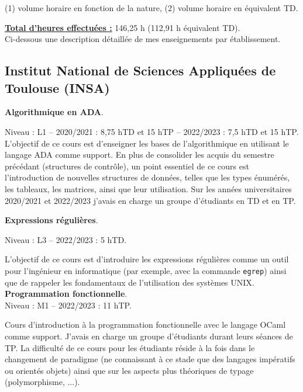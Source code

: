 (1) volume horaire en fonction de la nature, (2) volume horaire en équivalent TD.

\vspace{10pt}

\underline{\textbf{Total d'heures effectuées :}} 146,25 h (112,91 h équivalent TD).\\

Ci-dessous une description détaillée de mes enseignements par établissement.\\

\subsection*{Institut National de Sciences Appliquées de Toulouse (INSA)}

\vspace{10pt}
\textbf{Algorithmique en ADA}.\medbreak 

Niveau : L1 -- 2020/2021 : 8,75 hTD et 15 hTP -- 2022/2023 : 7,5 hTD et 15 hTP.
\medbreak 
L'objectif de ce cours est d'enseigner les bases de l'algorithmique en utilisant
le langage ADA comme support. En plus de consolider les acquis du semestre
précédant (structures de contrôle), un point essentiel de ce cours est
l'introduction de nouvelles structures de données, telles que les types
énumérés, les tableaux, les matrices, ainsi que leur utilisation. Sur les années
universitaires 2020/2021 et 2022/2023 j'avais en charge un groupe d'étudiants en
TD et en TP. 

\vspace{10pt}
\textbf{Expressions régulières}.\medbreak 

Niveau : L3 -- 2022/2023 : 5 hTD.\medbreak

L'objectif de ce cours est d'introduire les expressions régulières comme un
outil pour l'ingénieur en informatique (par exemple, avec la commande
\texttt{egrep}) ainsi que de rappeler les fondamentaux de l'utilisation des
systèmes UNIX.
\newpage
\vspace{10pt}
\textbf{Programmation fonctionnelle}.\\

Niveau : M1 -- 2022/2023 : 11 hTP.\medbreak

Cours d'introduction à la programmation fonctionnelle avec le langage OCaml
comme support. J'avais en charge un groupe d'étudiants durant leurs séances de
TP. La difficulté de ce cours pour les étudiants réside à la fois dans le changement de
paradigme (ne connaissant à ce stade que des langages impératifs ou orientés
objets) ainsi que sur les aspects plus théoriques de typage (polymorphisme,
...).
\bigbreak

